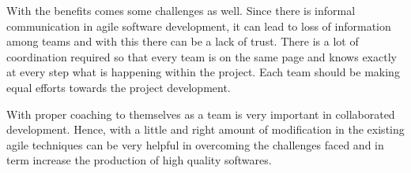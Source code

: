\documentclass[sigconf]{acmart}
\begin{document}
With the benefits comes some challenges as well. Since there is informal communication in agile software development, it can lead to loss of information among teams and with this there can be a lack of trust. There is a lot of coordination required so that every team is on the same page and knows exactly at every step what is happening within the project. Each team should be making equal efforts towards the project development.

With proper coaching to themselves as a team is very important in collaborated development\cite{4638656}. Hence, with a little and right amount of modification in the existing agile techniques can be very helpful in overcoming the challenges faced and in term increase the production of high quality softwares.



% 
%
\end{document}
